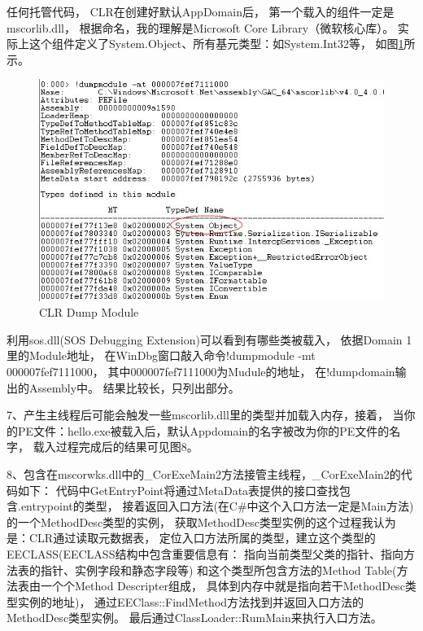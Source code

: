 \documentclass{book}
\begin{document}
任何托管代码，
CLR在创建好默认AppDomain后，
第一个载入的组件一定是mscorlib.dll，
根据命名，我的理解是Microsoft Core Library（微软核心库）。
实际上这个组件定义了System.Object、所有基元类型：如System.Int32等，
如图\ref{fig:CLRDumpMudoleMsCoreLib}所示。

\begin{figure}[htbp]
	\centering
	\includegraphics[scale=0.8]{CLRDumpMudoleMsCoreLib.jpg}
	\caption{CLR Dump Module}
	\label{fig:CLRDumpMudoleMsCoreLib}
\end{figure}

利用sos.dll(SOS Debugging Extension)可以看到有哪些类被载入，
依据Domain 1里的Module地址，
在WinDbg窗口敲入命令!dumpmodule -mt 000007fef7111000，
其中000007fef7111000为Mudule的地址，
在!dumpdomain输出的Assembly中。
结果比较长，只列出部分。

7、产生主线程后可能会触发一些mscorlib.dll里的类型并加载入内存，接着，
当你的PE文件：hello.exe被载入后，默认Appdomain的名字被改为你的PE文件的名字，
载入过程完成后的结果可见图8。
 
8、包含在mscorwks.dll中的\_CorExeMain2方法接管主线程，\_CorExeMain2的代码如下：
代码中GetEntryPoint将通过MetaData表提供的接口查找包含.entrypoint的类型，
接着返回入口方法(在C\#中这个入口方法一定是Main方法)的一个MethodDesc类型的实例，
获取MethodDesc类型实例的这个过程我认为是：CLR通过读取元数据表，
定位入口方法所属的类型，建立这个类型的EECLASS(EECLASS结构中包含重要信息有：
指向当前类型父类的指针、指向方法表的指针、实例字段和静态字段等)
和这个类型所包含方法的Method Table(方法表由一个个Method Descripter组成，
具体到内存中就是指向若干MethodDesc类型实例的地址)，
通过EEClass::FindMethod方法找到并返回入口方法的MethodDesc类型实例。
最后通过ClassLoader::RumMain来执行入口方法。
\end{document}
